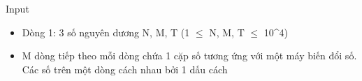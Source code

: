 Input
\begin{itemize}
	\item Dòng 1: 3 số nguyên dương N, M, T (1  $\le$  N, M, T  $\le$  10^4)
	\item M dòng tiếp theo mỗi dòng chứa 1 cặp số tương ứng với một máy biến đổi số. Các số trên một dòng cách nhau bởi 1 dấu cách
\end{itemize}